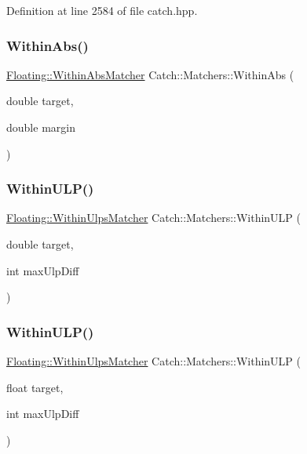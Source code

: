 Definition at line 2584 of file catch.\+hpp.

\mbox{\label{namespace_catch_1_1_matchers_a4c9ea76d47d02de0cf2d354c87c26e95}} 
\subsubsection{\texorpdfstring{Within\+Abs()}{WithinAbs()}}
{\footnotesize\ttfamily \mbox{\hyperlink{struct_catch_1_1_matchers_1_1_floating_1_1_within_abs_matcher}{Floating\+::\+Within\+Abs\+Matcher}} Catch\+::\+Matchers\+::\+Within\+Abs (\begin{DoxyParamCaption}\item[{double}]{target,  }\item[{double}]{margin }\end{DoxyParamCaption})}

\mbox{\label{namespace_catch_1_1_matchers_ae895591bd78a7d0ce4cdf3cf40d89ab5}} 
\subsubsection{\texorpdfstring{Within\+U\+L\+P()}{WithinULP()}\hspace{0.1cm}{\footnotesize\ttfamily [1/2]}}
{\footnotesize\ttfamily \mbox{\hyperlink{struct_catch_1_1_matchers_1_1_floating_1_1_within_ulps_matcher}{Floating\+::\+Within\+Ulps\+Matcher}} Catch\+::\+Matchers\+::\+Within\+U\+LP (\begin{DoxyParamCaption}\item[{double}]{target,  }\item[{int}]{max\+Ulp\+Diff }\end{DoxyParamCaption})}

\mbox{\label{namespace_catch_1_1_matchers_ab87ee77e5349fac450d1e631dee86496}} 
\subsubsection{\texorpdfstring{Within\+U\+L\+P()}{WithinULP()}\hspace{0.1cm}{\footnotesize\ttfamily [2/2]}}
{\footnotesize\ttfamily \mbox{\hyperlink{struct_catch_1_1_matchers_1_1_floating_1_1_within_ulps_matcher}{Floating\+::\+Within\+Ulps\+Matcher}} Catch\+::\+Matchers\+::\+Within\+U\+LP (\begin{DoxyParamCaption}\item[{float}]{target,  }\item[{int}]{max\+Ulp\+Diff }\end{DoxyParamCaption})}

